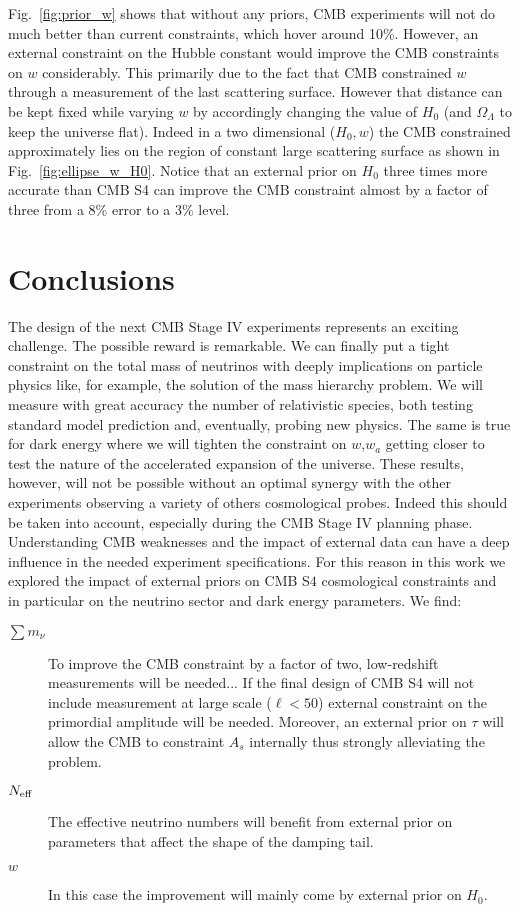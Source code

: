 \documentclass[aps,prd,reprint,superscriptaddress]{revtex4-1}
\newcommand{\reffig}[1]{Fig.~\ref{fig:#1}}
\begin{document}
\reffig{prior_w} shows that without any priors, CMB experiments will not do much better than current constraints, which hover around 10\%. However, an external constraint on the Hubble constant would improve the CMB constraints on $w$ considerably. 
This primarily due to the fact that CMB constrained $w$ through a measurement of the last scattering surface. However that distance can be kept fixed while varying $w$ by accordingly changing the value of $H_{0}$ (and $\Omega_{\Lambda}$ to keep the universe flat). Indeed in a two dimensional ($H_{0},w$) the CMB constrained approximately lies on the region of constant large scattering surface as shown in \reffig{ellipse_w_H0}.
Notice that an external prior on $H_{0}$ three times more accurate than CMB S4 can improve the CMB constraint almost by a factor of three from a $8\%$ error to a $3\%$ level.

\section{Conclusions  \label{sec:conclusions}}
The design of the next CMB Stage IV experiments represents an exciting challenge. The possible reward is remarkable. We can finally put a tight constraint on the total mass of neutrinos with deeply implications on particle physics like, for example, the solution of the mass hierarchy problem. We will measure with great accuracy the number of relativistic species, both testing standard model prediction and, eventually, probing new physics. The same is true for dark energy where we will tighten the constraint on $w$,$w_{a}$ getting closer to test the nature of the accelerated expansion of the universe. These results, however, will not be possible without an optimal synergy with the other experiments observing a variety of others cosmological probes.
Indeed this should be taken into account, especially during the CMB Stage IV planning phase. Understanding CMB weaknesses and the impact of external data can have a deep influence in the needed experiment specifications.
For this reason in this work we explored the impact of external priors on CMB S$4$ cosmological constraints and in particular on the neutrino sector and dark energy parameters.
We find:
\begin{description}
\item[$\sum m_\nu$] To improve the CMB constraint by a factor of two, low-redshift measurements will be needed... If the final design of CMB S4 will not include measurement at large scale ($\ell<50$) external constraint on the primordial amplitude will be needed. Moreover, an external prior on $\tau$ will allow the CMB to constraint $A_{s}$ internally thus strongly alleviating the problem.
\item[$N_{\rm eff}$] The effective neutrino numbers will benefit from external prior on parameters that affect the shape of the damping tail.
\item[$w$] In this case the improvement will mainly come by external prior on $H_{0}$.
\end{description}
\end{document}
